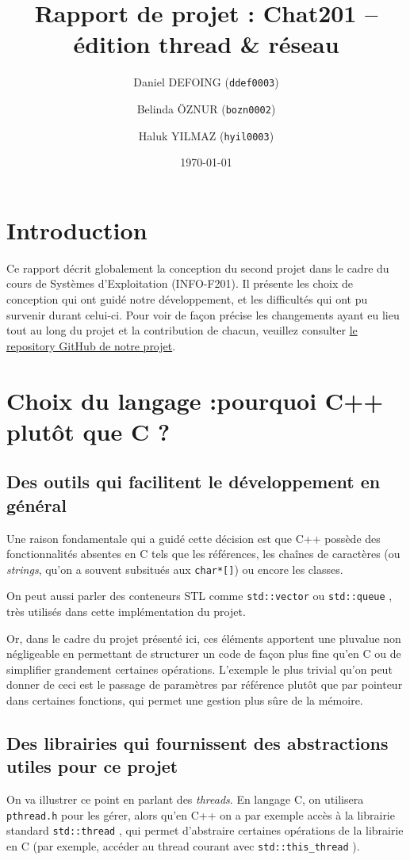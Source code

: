 \documentclass{article}
\title{Rapport de projet : Chat201 – édition thread \& réseau}
\author{Daniel DEFOING (\texttt{ddef0003}) \and 
        Belinda ÖZNUR (\texttt{bozn0002}) \and
        Haluk YILMAZ (\texttt{hyil0003})}
\date{\today}
\begin{document}

\maketitle
\tableofcontents
\newpage

\section{Introduction}
\noindent Ce rapport décrit globalement la conception du second projet dans le cadre du cours de Systèmes d'Exploitation
(INFO-F201). Il présente les choix de conception qui ont guidé notre développement, et les difficultés qui ont pu survenir durant celui-ci. Pour voir de façon précise les changements ayant eu lieu tout au long du projet et la contribution de chacun, veuillez consulter \hyperref[https://github.com/Daniel-Dfg/OS_Projet_2]{le repository GitHub de notre projet}.

\section{Choix du langage :pourquoi C++ plutôt que C ?}

\subsection*{Des outils qui facilitent le développement en général}
\noindent Une raison fondamentale qui a guidé cette décision est que C++ possède des fonctionnalités absentes en C tels que les références, les chaînes de caractères (ou \textit{strings}, qu'on a souvent subsitués aux \texttt{char*[]}) ou encore les classes. 

\noindent On peut aussi parler des conteneurs STL comme \texttt{std::vector} ou \texttt{std::queue} \cite{std::queue}, très utilisés dans cette implémentation du projet.


\noindent Or, dans le cadre du projet présenté ici, ces éléments apportent une pluvalue non négligeable en permettant de structurer un code de façon plus fine qu'en C ou de simplifier grandement certaines opérations. L'exemple le plus trivial qu'on peut donner de ceci est le passage de paramètres par référence plutôt que par pointeur dans certaines fonctions, qui permet une gestion plus sûre de la mémoire.

\subsection*{Des librairies qui fournissent des abstractions utiles pour ce projet}
\noindent On va illustrer ce point en parlant des \textit{threads}. En langage C, on utilisera \texttt{pthread.h} \cite{pthread.h} pour les gérer, alors qu'en C++ on a par exemple accès à la librairie standard \texttt{std::thread} \cite{std::thread}, qui permet d'abstraire certaines opérations de la librairie en C (par exemple, accéder au thread courant avec \texttt{std::this\_thread} \cite{std::thread}).
\end{document}
